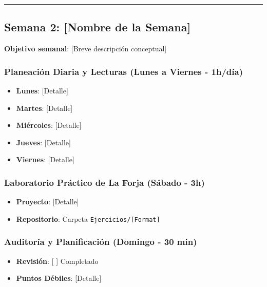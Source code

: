 \documentclass[11pt, a4paper]{article}
\begin{document}
\noindent\rule{\textwidth}{0.4pt}

\subsection{Semana 2: [Nombre de la Semana]}
\textbf{Objetivo semanal}: [Breve descripción conceptual]

\subsubsection{Planeación Diaria y Lecturas (Lunes a Viernes - 1h/día)}
\begin{itemize}
    \item \textbf{Lunes}: [Detalle]
    \item \textbf{Martes}: [Detalle]
    \item \textbf{Miércoles}: [Detalle]
    \item \textbf{Jueves}: [Detalle]
    \item \textbf{Viernes}: [Detalle]
\end{itemize}

\subsubsection{Laboratorio Práctico de La Forja (Sábado - 3h)}
\begin{itemize}
    \item \textbf{Proyecto}: [Detalle]
    \item \textbf{Repositorio}: Carpeta \texttt{Ejercicios/[Format]}
\end{itemize}

\subsubsection{Auditoría y Planificación (Domingo - 30 min)}
\begin{itemize}
    \item \textbf{Revisión}: [ ] Completado
    \item \textbf{Puntos Débiles}: [Detalle]
\end{itemize}
\end{document}
